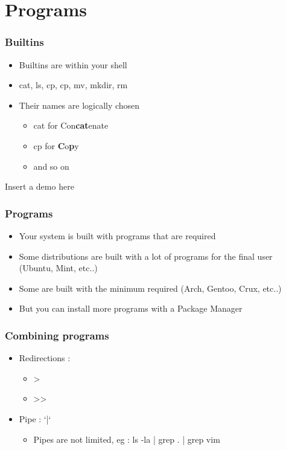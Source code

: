 \section{Programs}
\begin{frame}
    \frametitle{Builtins}
    \begin{itemize}
	\item Builtins are within your shell
	\item cat, ls, cp, cp, mv, mkdir, rm
	\item Their names are logically chosen
	\begin{itemize}
	    \item cat for Con\textbf{cat}enate
	    \item cp for \textbf{C}o\textbf{p}y
	    \item and so on
	\end{itemize}
    \end{itemize}
\end{frame}

\begin{frame}
    Insert a demo here
\end{frame}

\begin{frame}
    \frametitle{Programs}
    \begin{itemize}
	\item Your system is built with programs that are required
	\item Some distributions are built with a lot of programs for the final user (Ubuntu, Mint, etc..)
	\item Some are built with the minimum required (Arch, Gentoo, Crux, etc..)
	\item But you can install more programs with a Package Manager
    \end{itemize}
\end{frame}

\begin{frame}
    \frametitle{Combining programs}
    \begin{itemize}
	\item Redirections :
	\begin{itemize}
	    \item >
	    \item >>
	\end{itemize}
	\item Pipe : `|`
	\begin{itemize}
	    \item Pipes are not limited, eg : ls -la | grep . | grep vim
	\end{itemize}
    \end{itemize}
\end{frame}

